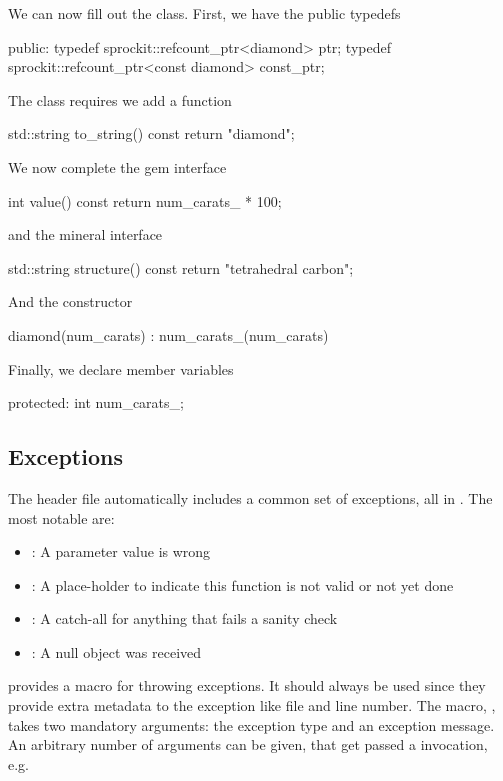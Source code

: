We can now fill out the class.  First, we have the public typedefs

\begin{CppCode}
 public:
  typedef sprockit::refcount_ptr<diamond> ptr;
  typedef sprockit::refcount_ptr<const diamond> const_ptr;
\end{CppCode}


The  class requires we add a  function

\begin{CppCode}
std::string
to_string() const {
  return "diamond";
}
\end{CppCode}

We now complete the gem interface

\begin{CppCode}
int
value() const {
  return num_carats_ * 100;
}
\end{CppCode}

and the mineral interface
\begin{CppCode}
std::string
structure() const {
  return "tetrahedral carbon";
}
\end{CppCode}

And the constructor

\begin{CppCode}
  diamond(num_carats)
   : num_carats_(num_carats)
{
}
\end{CppCode}

Finally, we declare member variables
\begin{CppCode}
 protected:
  int num_carats_;
\end{CppCode}


\subsection{Exceptions}
\label{classes:style:basic:exceptions}

The  header file automatically includes a common set of exceptions, all in .
The most notable are:
\begin{itemize}
\item {}: A parameter value is wrong
\item {}: A place-holder to indicate this function is not valid or not yet done
\item {}: A catch-all for anything that fails a sanity check
\item {}: A null object was received
\end{itemize}
\sprockit provides a macro for throwing exceptions.
It should always be used since they provide extra metadata to the exception like file and line number.
The macro, , takes two mandatory arguments: the exception type and an exception message.
An arbitrary number of arguments can be given, that get passed a  invocation, e.g.


